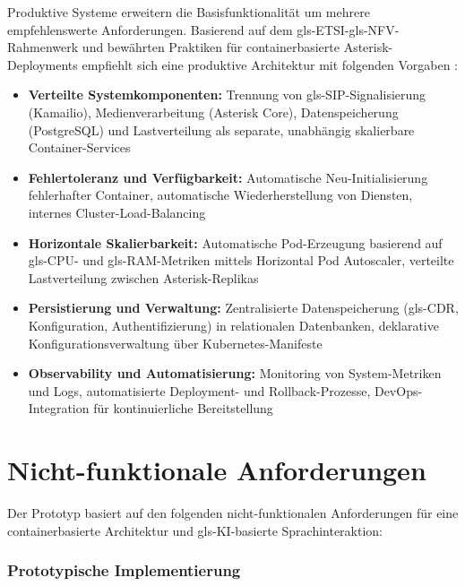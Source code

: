 Produktive Systeme erweitern die Basisfunktionalität um mehrere empfehlenswerte Anforderungen. Basierend auf dem \gls{gls-ETSI}-\gls{gls-NFV}-Rahmenwerk \parencite{ETSI-NFV, ETSI-REL} und bewährten Praktiken für containerbasierte Asterisk-Deployments empfiehlt sich eine produktive Architektur mit folgenden Vorgaben \parencite{Antonova2025}:

\begin{itemize}
  \item \textbf{Verteilte Systemkomponenten:} Trennung von \gls{gls-SIP}-Signalisierung (Kamailio), Medienverarbeitung (Asterisk Core), Datenspeicherung (PostgreSQL) und Lastverteilung als separate, unabhängig skalierbare Container-Services \parencite{Antonova2025}
  \item \textbf{Fehlertoleranz und Verfügbarkeit:} Automatische Neu-Initialisierung fehlerhafter Container, automatische Wiederherstellung von Diensten, internes Cluster-Load-Balancing \parencite{Antonova2025}
  \item \textbf{Horizontale Skalierbarkeit:} Automatische Pod-Erzeugung basierend auf \gls{gls-CPU}- und \gls{gls-RAM}-Metriken mittels Horizontal Pod Autoscaler, verteilte Lastverteilung zwischen Asterisk-Replikas \parencite{Antonova2025,KubernetesDocs}
  \item \textbf{Persistierung und Verwaltung:} Zentralisierte Datenspeicherung (\gls{gls-CDR}, Konfiguration, Authentifizierung) in relationalen Datenbanken, deklarative Konfigurationsverwaltung über Kubernetes-Manifeste \parencite{Antonova2025,KubernetesDocs}
  \item \textbf{Observability und Automatisierung:} Monitoring von System-Metriken und Logs, automatisierte Deployment- und Rollback-Prozesse, DevOps-Integration für kontinuierliche Bereitstellung \parencite{Antonova2025}
\end{itemize}

\section{Nicht-funktionale Anforderungen}

Der Prototyp basiert auf den folgenden nicht-funktionalen Anforderungen für eine containerbasierte Architektur und \gls{gls-KI}-basierte Sprachinteraktion:

\subsubsection{Prototypische Implementierung}

